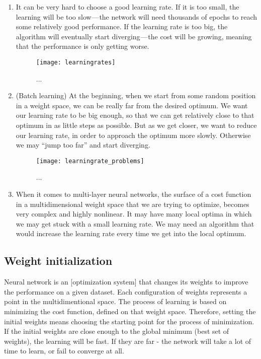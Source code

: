 \begin{enumerate}
  \item It can be very hard to choose a good learning rate. If it is too small, the learning will be too slow — the network will need thousands of epochs to reach some relatively good performance. If the learning rate is too big, the algorithm will eventually start diverging — the cost will be growing, meaning that the performance is only getting worse.
  
\begin{figure}[H]
  \centering
  \texttt{[image: learningrates]}
  \caption{...}
  \label{fig:learningrates}
\end{figure}
  
  \item (Batch learning) At the beginning, when we start from some random position in a weight space, we can be really far from the desired optimum. We want our learning rate to be big enough, so that we can get relatively close to that optimum in as little steps as possible. But as we get closer, we want to reduce our learning rate, in order to approach the optimum more slowly. Otherwise we may “jump too far” and start diverging.
  
\begin{figure}[H]
  \centering
  \texttt{[image: learningrate\_problems]}
  \caption{...}
  \label{fig:learningrate_problems}
\end{figure}
  
  \item When it comes to multi-layer neural networks, the surface of a cost function in a multidimensional weight space that we are trying to optimize, becomes very complex and highly nonlinear. It may have many local optima in which we may get stuck with a small learning rate. We may need an algorithm that would increase the learning rate every time we get into the local optimum.
\end{enumerate}

\subsection{Weight initialization}
Neural network is an [optimization system] that changes its weights to improve the performance on a given dataset. Each configuration of weights represents a point in the multidimentional space. The process of learning is based on minimizing the cost function, defined on that weight space. Therefore, setting the initial weights means choosing the starting point for the process of minimization. If the initial weights are close enough to the global minimum (best set of weights), the learning will be fast. If they are far - the network will take a lot of time to learn, or fail to converge at all.


